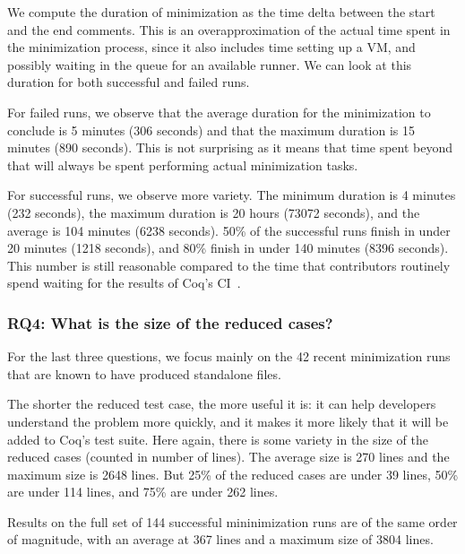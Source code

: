\documentclass[a4paper,USenglish,cleveref,autoref,thm-restate]{lipics-v2021}
\begin{document}
We compute the duration of minimization as the time delta between the start and the end comments.
This is an overapproximation of the actual time spent in the minimization process, since it also includes time setting up a VM, and possibly waiting in the queue for an available runner.
%
We can look at this duration for both successful and failed runs.

For failed runs, we observe that the average duration for the minimization to conclude is 5 minutes (306 seconds) and that the maximum duration is 15 minutes (890 seconds). This is not surprising as it means that time spent beyond that will always be spent performing actual minimization tasks.

For successful runs, we observe more variety. The minimum duration is 4 minutes (232 seconds), the maximum duration is 20 hours (73072 seconds), and the average is 104 minutes (6238 seconds). 50\% of the successful runs finish in under 20 minutes (1218 seconds), and 80\% finish in under 140 minutes (8396 seconds). This number is still reasonable compared to the time that contributors routinely spend waiting for the results of Coq's CI~\cite{zimmermann:tel-02451322}.

\subsubsection{RQ4: What is the size of the reduced cases?}

For the last three questions, we focus mainly on the 42 recent minimization runs that are known to have produced standalone files.

The shorter the reduced test case, the more useful it is: it can help developers understand the problem more quickly, and it makes it more likely that it will be added to Coq's test suite. Here again, there is some variety in the size of the reduced cases (counted in number of lines). The average size is 270 lines and the maximum size is 2648 lines. But 25\% of the reduced cases are under 39 lines, 50\% are under 114 lines, and 75\% are under 262 lines.

Results on the full set of 144 successful mininimization runs are of the same order of magnitude, with an average at 367 lines and a maximum size of 3804 lines.
\end{document}
